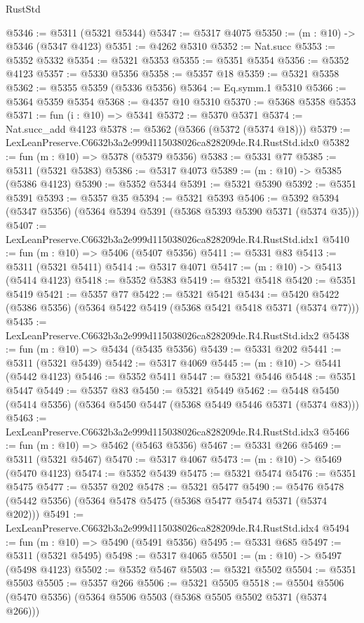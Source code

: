 \begin{lexlean}{RustStd}
\begin{coremodule}
@5346 := @5311 (@5321 @5344)
@5347 := @5317 @4075
@5350 := (m : @10) -> @5346 (@5347 @4123)
@5351 := @4262 @5310
@5352 := Nat.succ
@5353 := @5352 @5332
@5354 := @5321 @5353
@5355 := @5351 @5354
@5356 := @5352 @4123
@5357 := @5330 @5356
@5358 := @5357 @18
@5359 := @5321 @5358
@5362 := @5355 @5359 (@5336 @5356)
@5364 := Eq.symm.{1} @5310
@5366 := @5364 @5359 @5354
@5368 := @4357 @10 @5310
@5370 := @5368 @5358 @5353
@5371 := fun (i : @10) => @5341
@5372 := @5370 @5371
@5374 := Nat.succ_add @4123
@5378 := @5362 (@5366 (@5372 (@5374 @18)))
@5379 := LexLeanPreserve.C6632b3a2e999d115038026ca828209de.R4.RustStd.idx0
@5382 := fun (m : @10) => @5378 (@5379 @5356)
@5383 := @5331 @77
@5385 := @5311 (@5321 @5383)
@5386 := @5317 @4073
@5389 := (m : @10) -> @5385 (@5386 @4123)
@5390 := @5352 @5344
@5391 := @5321 @5390
@5392 := @5351 @5391
@5393 := @5357 @35
@5394 := @5321 @5393
@5406 := @5392 @5394 (@5347 @5356) (@5364 @5394 @5391 (@5368 @5393 @5390 @5371 (@5374 @35)))
@5407 := LexLeanPreserve.C6632b3a2e999d115038026ca828209de.R4.RustStd.idx1
@5410 := fun (m : @10) => @5406 (@5407 @5356)
@5411 := @5331 @83
@5413 := @5311 (@5321 @5411)
@5414 := @5317 @4071
@5417 := (m : @10) -> @5413 (@5414 @4123)
@5418 := @5352 @5383
@5419 := @5321 @5418
@5420 := @5351 @5419
@5421 := @5357 @77
@5422 := @5321 @5421
@5434 := @5420 @5422 (@5386 @5356) (@5364 @5422 @5419 (@5368 @5421 @5418 @5371 (@5374 @77)))
@5435 := LexLeanPreserve.C6632b3a2e999d115038026ca828209de.R4.RustStd.idx2
@5438 := fun (m : @10) => @5434 (@5435 @5356)
@5439 := @5331 @202
@5441 := @5311 (@5321 @5439)
@5442 := @5317 @4069
@5445 := (m : @10) -> @5441 (@5442 @4123)
@5446 := @5352 @5411
@5447 := @5321 @5446
@5448 := @5351 @5447
@5449 := @5357 @83
@5450 := @5321 @5449
@5462 := @5448 @5450 (@5414 @5356) (@5364 @5450 @5447 (@5368 @5449 @5446 @5371 (@5374 @83)))
@5463 := LexLeanPreserve.C6632b3a2e999d115038026ca828209de.R4.RustStd.idx3
@5466 := fun (m : @10) => @5462 (@5463 @5356)
@5467 := @5331 @266
@5469 := @5311 (@5321 @5467)
@5470 := @5317 @4067
@5473 := (m : @10) -> @5469 (@5470 @4123)
@5474 := @5352 @5439
@5475 := @5321 @5474
@5476 := @5351 @5475
@5477 := @5357 @202
@5478 := @5321 @5477
@5490 := @5476 @5478 (@5442 @5356) (@5364 @5478 @5475 (@5368 @5477 @5474 @5371 (@5374 @202)))
@5491 := LexLeanPreserve.C6632b3a2e999d115038026ca828209de.R4.RustStd.idx4
@5494 := fun (m : @10) => @5490 (@5491 @5356)
@5495 := @5331 @685
@5497 := @5311 (@5321 @5495)
@5498 := @5317 @4065
@5501 := (m : @10) -> @5497 (@5498 @4123)
@5502 := @5352 @5467
@5503 := @5321 @5502
@5504 := @5351 @5503
@5505 := @5357 @266
@5506 := @5321 @5505
@5518 := @5504 @5506 (@5470 @5356) (@5364 @5506 @5503 (@5368 @5505 @5502 @5371 (@5374 @266)))

\end{coremodule}
\end{lexlean}
